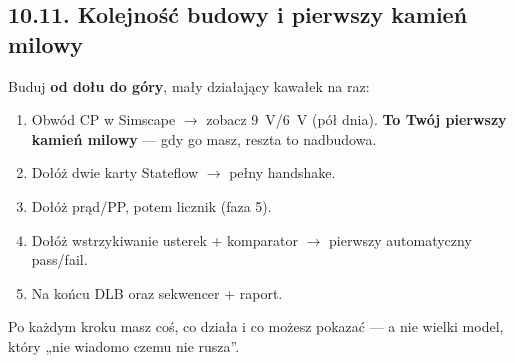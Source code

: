 \documentclass[11pt]{article}
\newcommand{\ra}{$\rightarrow$}
\newcommand{\key}[1]{\textbf{\color{navy}#1}}
\begin{document}
\subsection{10.11. Kolejność budowy i pierwszy kamień milowy}

Buduj \key{od dołu do góry}, mały działający kawałek na raz:
\begin{enumerate}
  \item Obwód CP w Simscape \ra{} zobacz 9~V/6~V (pół dnia). \key{To Twój pierwszy kamień milowy} --- gdy go masz, reszta to nadbudowa.
  \item Dołóż dwie karty Stateflow \ra{} pełny handshake.
  \item Dołóż prąd/PP, potem licznik (faza 5).
  \item Dołóż wstrzykiwanie usterek + komparator \ra{} pierwszy automatyczny pass/fail.
  \item Na końcu DLB oraz sekwencer + raport.
\end{enumerate}
Po każdym kroku masz coś, co działa i co możesz pokazać --- a nie wielki model, który „nie wiadomo czemu nie rusza''.
\end{document}
